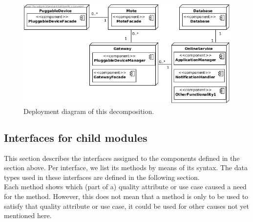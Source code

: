         \begin{figure}[!htp]
        	\centering
        	\includegraphics[width=1.00\textwidth]{deployment-diagram-1}
        	\caption{Deployment diagram of this decomposition.}\label{fig:it1-depl_main}
        \end{figure}


\subsection{Interfaces for child modules}\label{add1-interfaces}
    This section describes the interfaces assigned to the components defined
    in the section above. Per interface, we list its methods by means of its
    syntax. The data types used in these interfaces are defined in the following section. \\

    \noindent Each method shows which (part of a) quality attribute or use case caused
    a need for the method. However, this does not mean that a method is
    only to be used to satisfy that quality  attribute or use case, it could
    be used for other causes not yet mentioned here.

